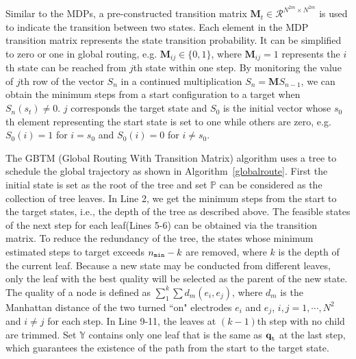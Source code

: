 \documentclass[conference, onecolumn]{IEEEtran}
\begin{document}
Similar to the MDPs\cite{filar2012competitive}, a pre-constructed transition matrix $\textbf{M}_t \in \mathcal{R}^{N^{2m} \times N^{2m}}$ is used to indicate the transition between two states. Each element in the MDP transition matrix represents the state transition probability. It can be simplified to zero or one in global routing, e.g. $\textbf{M}_{ij} \in \{0,1\}$, where $\textbf{M}_{ij} = 1$ represents the $i$th state can be reached from $j$th state within one step.
By monitoring the value of $j$th row of the vector $S_n$ in a continued multiplication $S_n =\textbf{M}S_{n-1}$, we can obtain the minimum steps from a start configuration to a target when $S_n(s_t)\neq 0$. $j$ corresponds the target state and $S_0$ is the initial vector whose $s_0$th element representing the start state is set to one while others are zero, e.g. $S_0(i) = 1$ for $i=s_0$ and $S_0(i) = 0$ for $i \neq s_0$.

The GBTM (Global Routing With Transition Matrix) algorithm uses a tree to schedule the global trajectory as shown in Algorithm~\ref{globalroute}. First the initial state is set as the root of the tree and set $\mathbb{P} $ can be considered as the collection of tree leaves. In Line 2, we get the minimum steps from the start to the target states, i.e., the depth of the tree as described above. The feasible states of the next step for each leaf(Lines 5-6) can be obtained via the transition matrix. To reduce the redundancy of the tree, the states whose minimum estimated steps to target exceeds $n_{\tt min}-k$ are removed, where $k$ is the depth of the current leaf. Because a new state may be conducted from different leaves, only the leaf with the best quality will be selected as the parent of the new state. The quality of a node is defined as $\sum_{1}^{k} \sum d_m(e_i,e_j)$, where $d_m$ is the Manhattan distance of the two turned ``on" electrodes $e_i$ and $e_j$, $i, j=1,\cdots, N^2$ and $i\neq j$ for each step. In Line 9-11, the leaves at $(k-1)$th step with no child are trimmed. Set $\mathbb{Y}$ contains only one leaf that is the same as $\textbf{q}_{\tt t}$ at the last step, which guarantees the existence of the path from the start to the target state.
\end{document}
